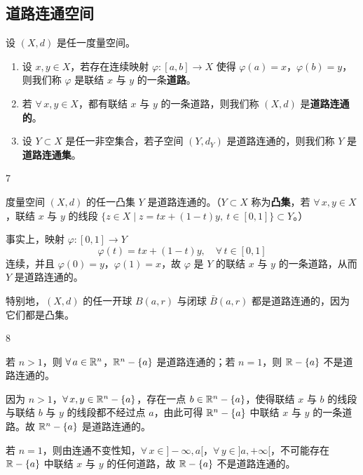 \subsection{道路连通空间}
	\label{sec:10-6-4}

\begin{mydef*}{}

设 $(X,d)$ 是任一度量空间。

\begin{enumerate}[label=\arabic{enumi})]
\item 设 $x,y\in X$，若存在连续映射 $\varphi:[a,b]\to X$ 使得 $\varphi(a)=x$，$\varphi(b)=y$，则我们称 $\varphi$ 是联结 $x$ 与 $y$ 的一条\textbf{道路}。
\item 若 $\forall\,x,y\in X$，都有联结 $x$ 与 $y$ 的一条道路，则我们称 $(X,d)$ 是\textbf{道路连通的}。
\item 设 $Y\subset X$ 是任一非空集合，若子空间 $(Y,d_Y)$ 是道路连通的，则我们称 $Y$ 是\textbf{道路连通集}。
\end{enumerate}

\end{mydef*}

\begin{sourceexample}{7}

度量空间 $(X,d)$ 的任一凸集 $Y$ 是道路连通的。（$Y\subset X$ 称为\textbf{凸集}，若 $\forall\,x,y\in X$，联结 $x$ 与 $y$ 的线段 $\{z\in X\mid z=tx+(1-t)y,\ t\in[0,1]\}\subset Y$。）

事实上，映射 $\varphi:[0,1]\to Y$
\[\varphi(t)=tx+(1-t)y,\quad\forall\,t\in[0,1]\]
连续，并且 $\varphi(0)=y$，$\varphi(1)=x$，故 $\varphi$ 是 $Y$ 的联结 $x$ 与 $y$ 的一条道路，从而 $Y$ 是道路连通的。

特别地，$(X,d)$ 的任一开球 $B(a,r)$ 与闭球 $\bar B(a,r)$ 都是道路连通的，因为它们都是凸集。

\end{sourceexample}

\begin{sourceexample}{8}

若 $n>1$，则 $\forall\,a\in\mathbb{R}^n$，$\mathbb{R}^n-\{a\}$ 是道路连通的；若 $n=1$，则 $\mathbb{R}-\{a\}$ 不是道路连通的。

因为 $n>1$，$\forall\,x,y\in\mathbb{R}^n-\{a\}$，存在一点 $b\in\mathbb{R}^n-\{a\}$，使得联结 $x$ 与 $b$ 的线段与联结 $b$ 与 $y$ 的线段都不经过点 $a$，由此可得 $\mathbb{R}^n-\{a\}$ 中联结 $x$ 与 $y$ 的一条道路。故 $\mathbb{R}^n-\{a\}$ 是道路连通的。

若 $n=1$，则由连通不变性知，$\forall\,x\in]-\infty,a[$，$\forall\,y\in]a,+\infty[$，不可能存在 $\mathbb{R}-\{a\}$ 中联结 $x$ 与 $y$ 的任何道路，故 $\mathbb{R}-\{a\}$ 不是道路连通的。

\end{sourceexample}

